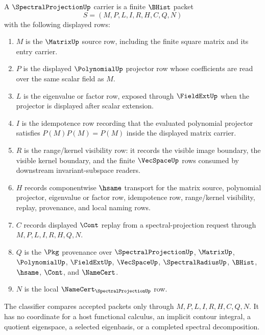 \begin{definition}
\label{def:spectral-projection-carrier}
A $\SpectralProjectionUp$ carrier is a finite $\BHist$ packet
$$
S=(M,P,L,I,R,H,C,Q,N)
$$
with the following displayed rows:
\begin{enumerate}
\item $M$ is the $\MatrixUp$ source row, including the finite square matrix and its entry carrier.
\item $P$ is the displayed $\PolynomialUp$ projector row whose coefficients are read over the same scalar field as $M$.
\item $L$ is the eigenvalue or factor row, exposed through $\FieldExtUp$ when the projector is displayed after scalar extension.
\item $I$ is the idempotence row recording that the evaluated polynomial projector satisfies $P(M)P(M)=P(M)$ inside the displayed matrix carrier.
\item $R$ is the range/kernel visibility row: it records the visible image boundary, the visible kernel boundary, and the finite $\VecSpaceUp$ rows consumed by downstream invariant-subspace readers.
\item $H$ records componentwise $\hsame$ transport for the matrix source, polynomial projector, eigenvalue or factor row, idempotence row, range/kernel visibility, replay, provenance, and local naming rows.
\item $C$ records displayed $\Cont$ replay from a spectral-projection request through $M,P,L,I,R,H,Q,N$.
\item $Q$ is the $\Pkg$ provenance over $\SpectralProjectionUp$, $\MatrixUp$, $\PolynomialUp$, $\FieldExtUp$, $\VecSpaceUp$, $\SpectralRadiusUp$, $\BHist$, $\hsame$, $\Cont$, and $\NameCert$.
\item $N$ is the local $\NameCert_{\SpectralProjectionUp}$ row.
\end{enumerate}
The classifier compares accepted packets only through $M,P,L,I,R,H,C,Q,N$. It has no coordinate for a host functional calculus, an implicit contour integral, a quotient eigenspace, a selected eigenbasis, or a completed spectral decomposition.
\end{definition}

